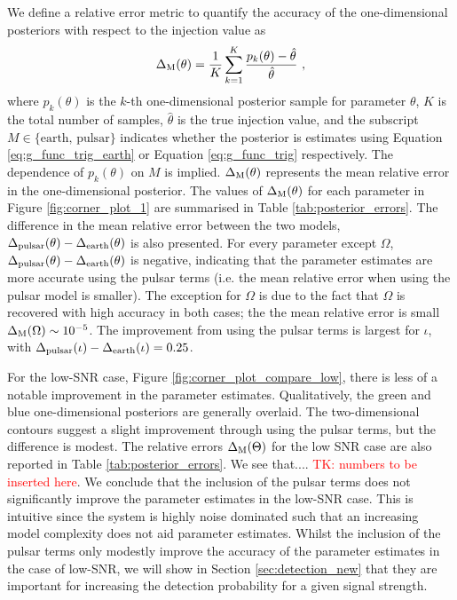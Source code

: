 \documentclass[fleqn,usenatbib,useAMS]{mnras}
\begin{document}
We define a relative error metric to quantify the accuracy of the one-dimensional posteriors with respect to the injection value as
\begin{equation}
\Delta_{\rm M}(\theta) = \frac{1}{K}\sum_{k=1}^{K} \frac{p_k(\theta) - \hat{\theta}}{\hat{\theta}} \ , 
\end{equation}
where $p_k(\theta)$ is the $k$-th one-dimensional posterior sample for parameter $\theta$, $K$ is the total number of samples, $\hat{\theta}$ is the true injection value, and the subscript $M \in \{ \text{earth, pulsar} \}$ indicates whether the posterior is estimates using Equation \eqref{eq:g_func_trig_earth} or Equation \eqref{eq:g_func_trig} respectively. The dependence of $p_k(\theta)$ on $M$ is implied. $\Delta_{\rm M}(\theta)$ represents the mean relative error in the one-dimensional posterior. The values of $\Delta_{\rm M}(\theta)$ for each parameter in Figure \ref{fig:corner_plot_1} are summarised in Table \ref{tab:posterior_errors}. The difference in the mean relative error between the two models, $\Delta_{\rm pulsar}(\theta) - \Delta_{\rm earth}(\theta)$ is also presented. For every parameter except $\Omega$, $\Delta_{\rm pulsar}(\theta) - \Delta_{\rm earth}(\theta)$ is negative, indicating that the parameter estimates are more accurate using the pulsar terms (i.e. the mean relative error when using the pulsar model is smaller). The exception for $\Omega$ is due to the fact that $\Omega$ is recovered with high accuracy in both cases; the the mean relative error is small $\Delta_{\rm M}(\Omega) \sim 10^{-5}$. The improvement from using the pulsar terms is largest for $\iota$, with $\Delta_{\rm pulsar}(\iota) - \Delta_{\rm earth}(\iota) = 0.25$. \newline 
		
		
For the low-SNR case,  Figure \ref{fig:corner_plot_compare_low}, there is less of a notable improvement in the parameter estimates. Qualitatively, the green and blue one-dimensional posteriors are generally overlaid. The two-dimensional contours suggest a slight improvement through using the pulsar terms, but the difference is modest. The relative errors 	$\Delta_{\rm M}(\Theta)$ for the low SNR case are also reported in Table \ref{tab:posterior_errors}. We see that.... \textcolor{red}{TK: numbers to be inserted here}. We conclude that the inclusion of the pulsar terms does not significantly improve the parameter estimates in the low-SNR case. This is intuitive since the system is highly noise dominated such that an increasing model complexity does not aid parameter estimates. Whilst the inclusion of the pulsar terms only modestly improve the accuracy of the parameter estimates in the case of low-SNR, we will show in Section \ref{sec:detection_new} that they are important for increasing the detection probability for a given signal strength. \newline 
		
\end{document}
